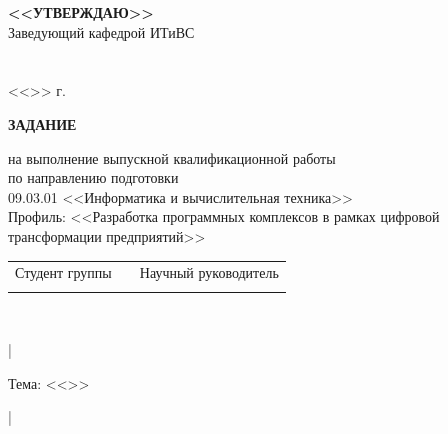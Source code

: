 \begingroup


\fontsize{12pt}{10pt}
\selectfont
\renewcommand{\arraystretch}{1} 



{}

\vkrStandartHead 

\vspace{1cm}

\hfill%
\begin{minipage}{0.5\linewidth}
	\raggedleft
	\textbf{<<УТВЕРЖДАЮ>>}\\
	Заведующий кафедрой ИТиВС\\
	\vkrKafedraHeadTitles\space\vkrKafedraHeadShort\\[3ex]
	\underline{\hspace{30mm}}\\
	<<\underline{\hspace{7mm}}>>\underline{\hspace{30mm}} \VKRassigmentYear г.
\end{minipage}

\vspace{0.5cm}

\begin{center}
	{\fontsize{14pt}{30pt}\selectfont\textbf{ЗАДАНИЕ}} \vspace{3pt}
	
	на выполнение выпускной квалификационной работы \\
	по направлению подготовки \\
	09.03.01 <<Информатика и вычислительная техника>>\\
	Профиль: <<Разработка программных комплексов в рамках цифровой трансформации предприятий>>
\end{center}

{
	\centering\fontsize{14pt}{12pt}\selectfont
	\begin{tabular} {l l l}
		Студент группы \vkrStudentGroup    	& \hspace{1cm} &  	Научный руководитель \\
		\vkrStudentShort					&              & 	\insertPersonInfo{Advisor} \vkrAdvisorShort\\
	\end{tabular}\\
}

\begin{center}
	\fontsize{14pt}{12pt}\selectfont
	\ifDebug|\fi\parbox{0.90\linewidth}{\centering Тема: <<\vkrTheme>>}\ifDebug|\fi
	
\end{center}

